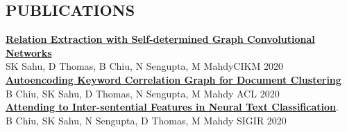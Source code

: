 \documentclass[margin, line]{res} %
\begin{document}
\begin{resume}
\section{PUBLICATIONS}
\textbf{\href{https://arxiv.org/abs/2008.00441}{Relation Extraction with Self-determined Graph Convolutional Networks}} \\SK Sahu, D Thomas, B Chiu, N Sengupta, M Mahdy\hfill  CIKM 2020 \\
\textbf{\href{https://aclanthology.org/2020.acl-main.366.pdf}{Autoencoding Keyword Correlation Graph for Document Clustering}}\\B Chiu, SK Sahu, D Thomas, N Sengupta, M Mahdy  \hfill ACL 2020 \\
\textbf{\href{https://dl.acm.org/doi/10.1145/3397271.3401203}{Attending to Inter-sentential Features in Neural Text Classification}}.\\B Chiu, SK Sahu, N Sengupta, D Thomas, M Mahdy  \hfill SIGIR 2020 \\
\vspace{-5mm}


\end{resume}
\end{document}
